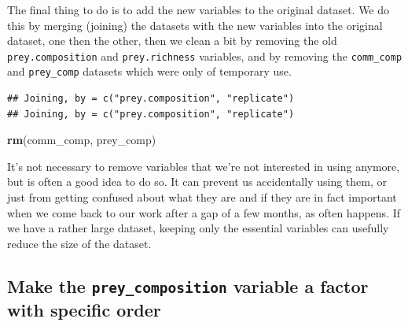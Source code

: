 \documentclass[]{book}
\newenvironment{Shaded}{\begin{snugshade}}{\end{snugshade}}
\newcommand{\KeywordTok}[1]{\textcolor[rgb]{0.13,0.29,0.53}{\textbf{#1}}}
\newcommand{\NormalTok}[1]{#1}
\newcommand{\OperatorTok}[1]{\textcolor[rgb]{0.81,0.36,0.00}{\textbf{#1}}}
\newcommand{\StringTok}[1]{\textcolor[rgb]{0.31,0.60,0.02}{#1}}
\begin{document}
The final thing to do is to add the new variables to the original dataset. We do this by merging (joining) the datasets with the new variables into the original dataset, one then the other, then we clean a bit by removing the old \texttt{prey.composition} and \texttt{prey.richness} variables, and by removing the \texttt{comm\_comp} and \texttt{prey\_comp} datasets which were only of temporary use.

\begin{Shaded}
\end{Shaded}

\begin{verbatim}
## Joining, by = c("prey.composition", "replicate")
## Joining, by = c("prey.composition", "replicate")
\end{verbatim}

\begin{Shaded}
\begin{Highlighting}[]
\KeywordTok{rm}\NormalTok{(comm_comp, prey_comp)}
\end{Highlighting}
\end{Shaded}

\begin{safety}
It's not necessary to remove variables that we're not interested in
using anymore, but is often a good idea to do so. It can prevent us
accidentally using them, or just from getting confused about what they
are and if they are in fact important when we come back to our work
after a gap of a few months, as often happens. If we have a rather large
dataset, keeping only the essential variables can usefully reduce the
size of the dataset.
\end{safety}

\hypertarget{make-the-prey_composition-variable-a-factor-with-specific-order}{%
\subsection{\texorpdfstring{Make the \texttt{prey\_composition} variable a factor with specific order}{Make the prey\_composition variable a factor with specific order}}\label{make-the-prey_composition-variable-a-factor-with-specific-order}}
\end{document}
